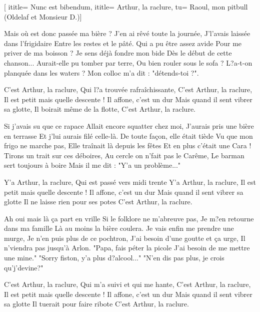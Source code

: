  [
ititle= {Nunc est bibendum},
ititle= {Arthur, la raclure},
tu= {Raoul, mon pitbull (Oldelaf et Monsieur D.)}]


\beginverse
Mais où est donc passée ma bière ?
J'en ai rêvé toute la journée,
J'l'avais laissée dans l'frigidaire
Entre les restes et le pâté.
Qui a pu être assez avide
Pour me priver de ma boisson ?
Je sens déjà fondre mon bide
Dès le début de cette chanson...
Aurait-elle pu tomber par terre,
Ou bien rouler sous le sofa ?
L?a-t-on planquée dans les waters ?
Mon colloc m'a dit : "détends-toi ?".
\endverse

\beginchorus
C'est Arthur, la raclure,
Qui l?a trouvée rafraîchissante,
C'est Arthur, la raclure,
Il est petit mais quelle descente !
Il affone, c'est un dur
Mais quand il sent vibrer sa glotte,
Il boirait même de la flotte,
C'est Arthur, la raclure.
\endchorus

\beginverse
Si j'avais su que ce rapace
Allait encore squatter chez moi,
J'aurais pris une bière en terrasse
Et j'lui aurais filé celle-là.
De toute façon, elle était tiède
Vu que mon frigo ne marche pas,
Elle traînait là depuis les fêtes
Et en plus c'était une Cara !
Tirons un trait sur ces déboires,
Au cercle on n'fait pas le Carême,
Le barman sert toujours à boire
Mais il me dit : "Y'a un problème..."
\endverse

\beginchorus
Y'a Arthur, la raclure,
Qui est passé vers midi trente
Y'a Arthur, la raclure,
Il est petit mais quelle descente !
Il affone, c'est un dur
Mais quand il sent vibrer sa glotte
Il ne laisse rien pour ses potes
C'est Arthur, la raclure.
\endchorus

\beginverse
Ah oui mais là ça part en vrille
Si le folklore ne m'abreuve pas,
Je m?en retourne dans ma famille
Là au moins la bière coulera.
Je vais enfin me prendre une murge,
Je n'en puis plus de ce pochtron,
J'ai besoin d'une goutte et ça urge,
Il n'viendra pas jusqu'à Arlon.
"Papa, fais péter la picole
J'ai besoin de me mettre une mine."
"Sorry fiston, y'a plus d?alcool..."
"N'en dis pas plus, je crois qu'j'devine?"
\endverse

\beginchorus
C'est Arthur, la raclure,
Qui m'a suivi et qui me hante,
C'est Arthur, la raclure,
Il est petit mais quelle descente !
Il affone, c'est un dur
Mais quand il sent vibrer sa glotte
Il tuerait pour faire ribote
C'est Arthur, la raclure.
\endchorus

